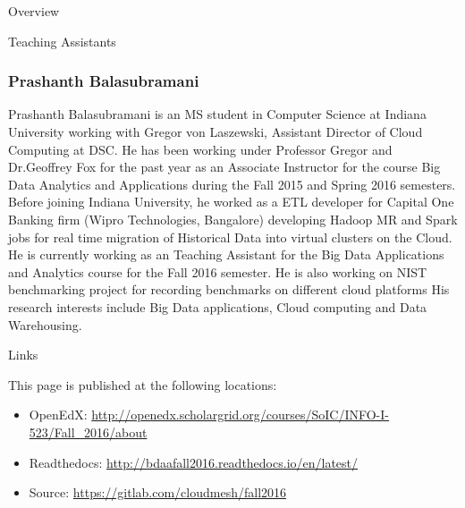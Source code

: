 \begin{edXchapter}{Overview}
\begin{edXsection}{Teaching Assistants}
\subsubsection{Prashanth Balasubramani}\label{prashanth-balasubramani}


Prashanth Balasubramani is an MS student in Computer Science at Indiana
University working with Gregor von Laszewski, Assistant Director of
Cloud Computing at DSC. He has been working under Professor Gregor and
Dr.Geoffrey Fox for the past year as an Associate Instructor for the
course Big Data Analytics and Applications during the Fall 2015 and
Spring 2016 semesters. Before joining Indiana University, he worked as a
ETL developer for Capital One Banking firm (Wipro Technologies,
Bangalore) developing Hadoop MR and Spark jobs for real time migration
of Historical Data into virtual clusters on the Cloud. He is currently
working as an Teaching Assistant for the Big Data Applications and
Analytics course for the Fall 2016 semester. He is also working on NIST
benchmarking project for recording benchmarks on different cloud
platforms His research interests include Big Data applications, Cloud
computing and Data Warehousing.

\end{edXsection}
\begin{edXsection}{Links}\label{links}

This page is published at the following locations:

\begin{itemize}
\itemsep1pt\parskip0pt
\item
  OpenEdX:
  \url{http://openedx.scholargrid.org/courses/SoIC/INFO-I-523/Fall_2016/about}
\item
  Readthedocs: \url{http://bdaafall2016.readthedocs.io/en/latest/}
\item
  Source: \url{https://gitlab.com/cloudmesh/fall2016}
\end{itemize}
\end{edXsection}

\end{edXchapter}